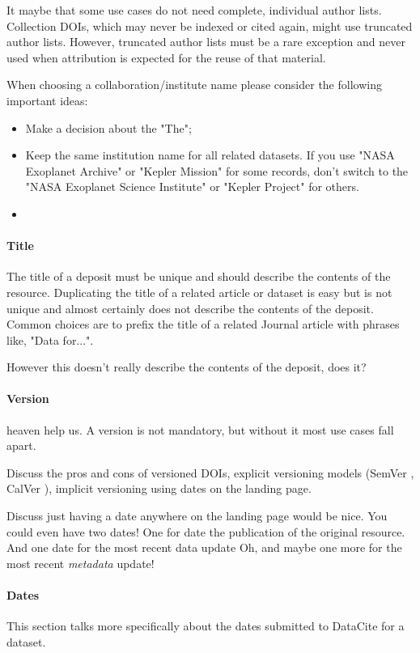 \documentclass[11pt,a4paper]{ivoa}
\begin{document}
It maybe that some use cases do not need complete, individual author lists.
Collection DOIs, which may never be indexed or cited again, might use truncated author lists. 
However, truncated author lists must be a rare exception and never used when attribution is expected for the reuse of that material. 

When choosing a collaboration/institute name please consider the following important ideas:
\begin{itemize}
\item Make a decision about the "The";
\item Keep the same institution name for all related datasets. If you use "NASA Exoplanet Archive" or "Kepler Mission" for some records, don't switch to the "NASA Exoplanet Science Institute" or "Kepler Project" for others. 
\item 
\end{itemize}

\paragraph{Title} 
The title of a deposit must be unique and should describe the contents of the resource. 
Duplicating the title of a related article or dataset is easy but is not unique and almost certainly does not describe the contents of the deposit.
Common choices are to prefix the title of a related Journal article with phrases like, "Data for...". 

However this doesn't really describe the contents of the deposit, does it? 

\paragraph{Version} 
heaven help us. A version is not mandatory, but without it most use cases fall apart.

Discuss the pros and cons of versioned DOIs, explicit versioning models (SemVer \citep{preston-werner_semantic_2023}, CalVer \citep{hashemi_calendar_2016}), implicit versioning using dates on the landing page.

Discuss just having a date anywhere on the landing page would be nice.
You could even have two dates! 
One for date the publication of the original resource.
And one date for the most recent data update
Oh, and maybe one more for the most recent \textit{metadata} update!

\paragraph{Dates} 
This section talks more specifically about the dates submitted to DataCite for a dataset.
\end{document}

